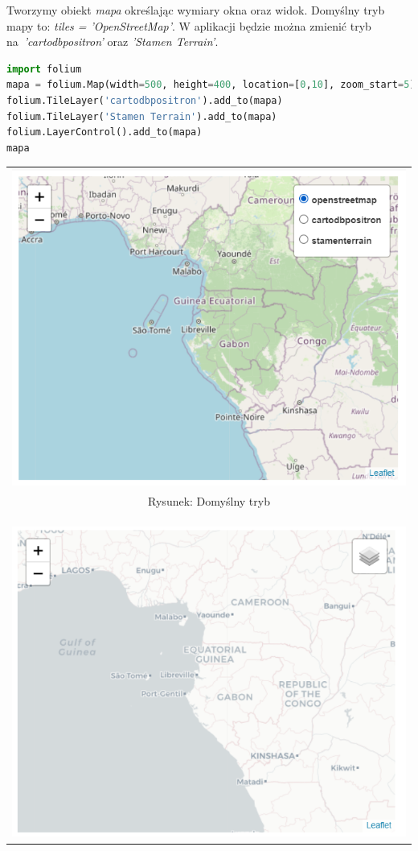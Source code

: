 \documentclass{article}
\begin{document}
Tworzymy obiekt \textit{mapa} określając wymiary okna oraz widok. Domyślny tryb mapy to: \textit{tiles = 'OpenStreetMap'}. W aplikacji będzie można zmienić tryb na~\textit{'cartodbpositron'} oraz \textit{'Stamen Terrain'}.
\begin{lstlisting}[language=Python, caption=Mapa]
import folium
mapa = folium.Map(width=500, height=400, location=[0,10], zoom_start=5)
folium.TileLayer('cartodbpositron').add_to(mapa)
folium.TileLayer('Stamen Terrain').add_to(mapa)
folium.LayerControl().add_to(mapa)
mapa
\end{lstlisting}
\begin{center}
\begin{tabular}{c}
\includegraphics[scale =.75]{"mapaopcje.PNG"}
\\
Rysunek: Domyślny tryb
\\\\\\\\
\includegraphics[scale = .75]{"mapa3.PNG"}

\end{tabular}
\end{center}
\end{document}
